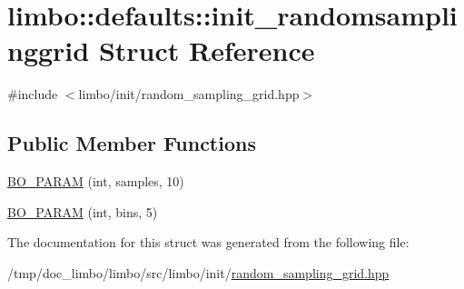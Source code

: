 \hypertarget{structlimbo_1_1defaults_1_1init__randomsamplinggrid}{}\section{limbo\+:\+:defaults\+:\+:init\+\_\+randomsamplinggrid Struct Reference}
\label{structlimbo_1_1defaults_1_1init__randomsamplinggrid}


{\ttfamily \#include $<$limbo/init/random\+\_\+sampling\+\_\+grid.\+hpp$>$}

\subsection*{Public Member Functions}
\begin{DoxyCompactItemize}
\item 
\hyperlink{group__init__defaults_ga5658d4c9a618c34b465ab42491d0062f}{B\+O\+\_\+\+P\+A\+R\+AM} (int, samples, 10)
\item 
\hyperlink{group__init__defaults_ga783c6c712518eb0a1e4abbfdffc0fa51}{B\+O\+\_\+\+P\+A\+R\+AM} (int, bins, 5)
\end{DoxyCompactItemize}


The documentation for this struct was generated from the following file\+:\begin{DoxyCompactItemize}
\item 
/tmp/doc\+\_\+limbo/limbo/src/limbo/init/\hyperlink{random__sampling__grid_8hpp}{random\+\_\+sampling\+\_\+grid.\+hpp}\end{DoxyCompactItemize}
